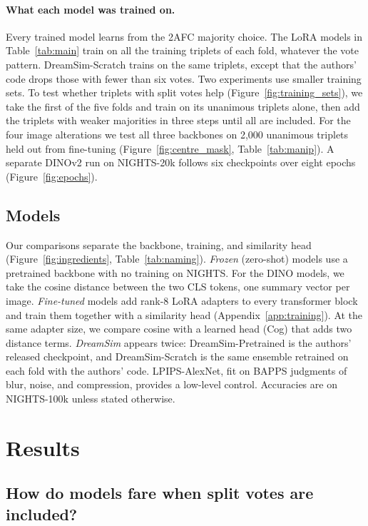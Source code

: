 \documentclass{article}
\begin{document}
\paragraph{What each model was trained on.} Every trained model learns from the 2AFC majority choice. The LoRA models in Table~\ref{tab:main} train on all the training triplets of each fold, whatever the vote pattern. DreamSim-Scratch trains on the same triplets, except that the authors' code drops those with fewer than six votes. Two experiments use smaller training sets. To test whether triplets with split votes help (Figure~\ref{fig:training_sets}), we take the first of the five folds and train on its unanimous triplets alone, then add the triplets with weaker majorities in three steps until all are included. For the four image alterations we test all three backbones on 2{,}000 unanimous triplets held out from fine-tuning (Figure~\ref{fig:centre_mask}, Table~\ref{tab:manip}). A separate DINOv2 run on NIGHTS-20k follows six checkpoints over eight epochs (Figure~\ref{fig:epochs}).

\subsection{Models}

Our comparisons separate the backbone, training, and similarity head (Figure~\ref{fig:ingredients}, Table~\ref{tab:naming}). \emph{Frozen} (zero-shot) models use a pretrained backbone with no training on NIGHTS. For the DINO models, we take the cosine distance between the two CLS tokens, one summary vector per image. \emph{Fine-tuned} models add rank-8 LoRA adapters to every transformer block and train them together with a similarity head (Appendix~\ref{app:training}). At the same adapter size, we compare cosine with a learned head (Cog) that adds two distance terms. \emph{DreamSim} appears twice: DreamSim-Pretrained is the authors' released checkpoint, and DreamSim-Scratch is the same ensemble retrained on each fold with the authors' code. LPIPS-AlexNet, fit on BAPPS judgments of blur, noise, and compression, provides a low-level control. Accuracies are on NIGHTS-100k unless stated otherwise.

\section{Results}

\subsection{How do models fare when split votes are included?}
\end{document}
